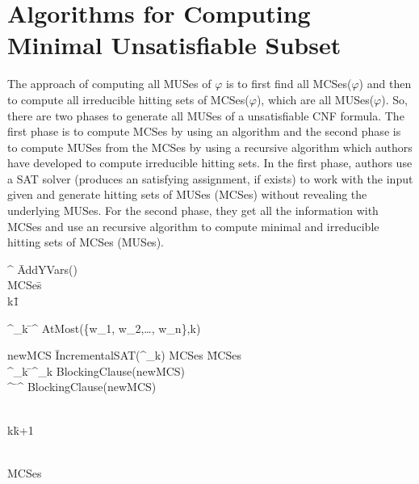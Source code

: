\section{Algorithms for Computing Minimal Unsatisfiable Subset}
\label{sec:algorithms for computing minimal unsatisfiable subset}
The approach of computing all MUSes of $\varphi$ is to first find all MCSes($\varphi$) and then to compute all irreducible hitting sets of MCSes($\varphi$), which are all MUSes($\varphi$). So, there are two phases to generate all MUSes of a unsatisfiable CNF formula. The first phase is to compute MCSes by using an algorithm and the second phase is to compute MUSes from the MCSes by using a recursive algorithm which authors have developed to compute irreducible hitting sets.\newline
In the first phase, authors use a SAT solver (produces an satisfying assignment, if exists) to work with the input given and generate hitting sets of MUSes (MCSes) without revealing the underlying MUSes. For the second phase, they get all the information with MCSes and use an recursive algorithm to compute minimal and irreducible hitting sets of MCSes (MUSes). 
\begin{Algorithm}
	\caption{Algorithm for finding all MCSes of a formula $\varphi$}
	\label{alg:findmcses}
	\begin{algorithm}{}{\text{$\varphi$}}
		\varphi^{\prime} \= AddYVars(\varphi) \\
		MCSes\=\emptyset \\
		k\=1 \\
		\begin{WHILE}{}
			\varphi^{\prime}_{k} \= \varphi^{\prime} \wedge AtMost(\{\neg w_{1}, \neg w_{2},\ldots, \neg w_{n}\},k) \\
			\begin{WHILE}{newMCS \= IncrementalSAT(\varphi^{\prime}_{k})}
				MCSes \= MCSes  \\
				\varphi^{\prime}_{k} \= \varphi^{\prime}_{k} \wedge BlockingClause(newMCS) \\
				\varphi^{\prime} \= \varphi^{\prime} \wedge BlockingClause(newMCS) \\
			\end{WHILE} \\
			k\=k+1 \\
		\end{WHILE} \\
		\RETURN MCSes
	\end{algorithm}
\end{Algorithm}
